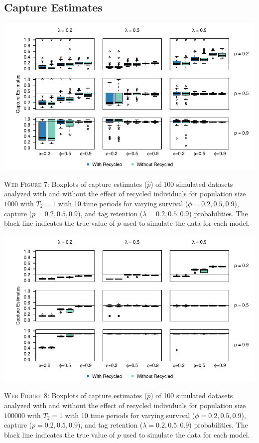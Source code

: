 \documentclass[]{article}
\begin{document}
\newpage

\subsection{Capture Estimates}\label{capture-estimates}

\includegraphics{Appendix_files/figure-latex/7_capture_GJSTL1-1.pdf}

\textsc{Web Figure 7:} Boxplots of capture estimates (\(\hat{p}\)) of
100 simulated datasets analyzed with and without the effect of recycled
individuals for population size \(1000\) with \(T_2=1\) with 10 time
periods for varying survival (\(\phi=0.2,0.5,0.9\)), capture
(\(p=0.2,0.5,0.9\)), and tag retention (\(\lambda=0.2,0.5,0.9\))
probabilities. The black line indicates the true value of \(p\) used to
simulate the data for each model.

\includegraphics{Appendix_files/figure-latex/8_capture_GJSTL2-1.pdf}

\textsc{Web Figure 8:} Boxplots of capture estimates (\(\hat{p}\)) of
100 simulated datasets analyzed with and without the effect of recycled
individuals for population size \(100000\) with \(T_2=1\) with 10 time
periods for varying survival (\(\phi=0.2,0.5,0.9\)), capture
(\(p=0.2,0.5,0.9\)), and tag retention (\(\lambda=0.2,0.5,0.9\))
probabilities. The black line indicates the true value of \(p\) used to
simulate the data for each model.
\end{document}
